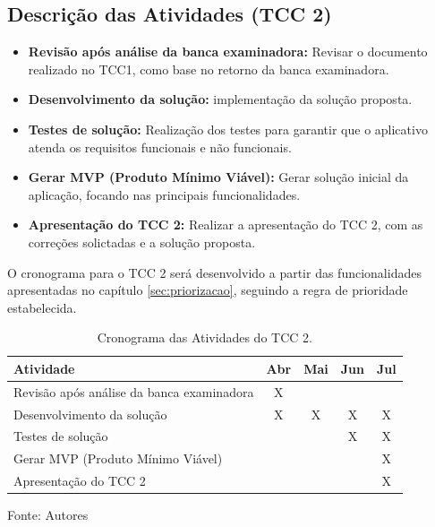 \subsection{Descrição das Atividades (TCC 2)}

\begin{itemize}
    \item \textbf{Revisão após análise da banca examinadora:} Revisar o documento realizado no TCC1, como base no retorno da banca examinadora.
    \item \textbf{Desenvolvimento da solução:} implementação da solução proposta.
    \item \textbf{Testes de solução:} Realização dos testes para garantir que o aplicativo atenda os requisitos funcionais e não funcionais.
    \item \textbf{Gerar MVP (Produto Mínimo Viável):} Gerar solução inicial da aplicação, focando nas principais funcionalidades.
    \item \textbf{Apresentação do TCC 2:} Realizar a apresentação do TCC 2, com as correções solictadas e a solução proposta.
\end{itemize}

O cronograma para o TCC 2 será desenvolvido a partir das funcionalidades apresentadas no capítulo \ref{sec:priorizacao}, seguindo a regra de prioridade estabelecida.

\begin{table}[h]
    \centering
    \caption{Cronograma das Atividades do TCC 2.}
    \label{tab:cronograma}
    \begin{adjustbox}{width=\textwidth}
        \begin{tabular}{|l|c|c|c|c|}
            \hline
            \textbf{Atividade} & \textbf{Abr} & \textbf{Mai} & \textbf{Jun} & \textbf{Jul} \\
            \hline
            Revisão após análise da banca examinadora & X &  &  &  \\
            Desenvolvimento da solução & X & X & X & X \\
            Testes de solução &  &  & X & X \\
            Gerar MVP (Produto Mínimo Viável) &  &  &  & X \\
            Apresentação do TCC 2 &  &  &  & X \\
            \hline
        \end{tabular}
    \end{adjustbox}
    \vspace{5mm}
    {\footnotesize Fonte: Autores}
\end{table}

